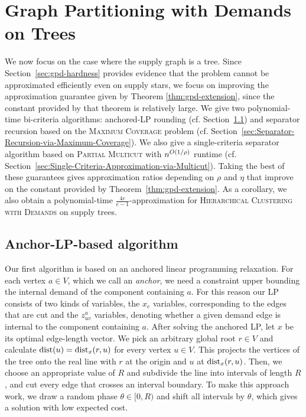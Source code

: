\section{Graph Partitioning with Demands on Trees}\label{sec:tree-configuration-lp}

We now focus on the case where the supply graph is a tree.
Since Section~\ref{sec:gpd-hardness} provides evidence that the problem cannot be approximated efficiently even on supply stars, we focus on improving the approximation guarantee given by Theorem \ref{thm:gpd-extension}, since the constant provided by that theorem is relatively large.
We give two polynomial-time bi-criteria algorithms: anchored-LP rounding (cf. Section~\ref{sec:Anchor-LP-based-algorithm}) and separator recursion based on the \textsc{Maximum Coverage} problem (cf. Section~\ref{sec:Separator-Recursion-via-Maximum-Coverage}). We also give a single-criteria separator algorithm based on \textsc{Partial Multicut} with $n^{O\mathopen{}\left( 1/\rho \right)}$ runtime (cf. Section~\ref{sec:Single-Criteria-Approximation-via-Multicut}).
Taking the best of these guarantees gives approximation ratios depending on $\rho$ and $\eta$ that improve on the constant provided by Theorem~\ref{thm:gpd-extension}.
As a corollary, we also obtain a polynomial-time $\frac{4e}{e-1}$-approximation for \textsc{Hierarchical Clustering with Demands} on supply trees. 

\subsection{Anchor-LP-based algorithm}
\label{sec:Anchor-LP-based-algorithm}

Our first algorithm is based on an anchored linear programming relaxation. For each vertex $a\in V$, which we call an \emph{anchor}, we need a constraint upper bounding the internal demand of the component containing $a$. For this reason our LP consists of two kinds of variables, the $x_e$ variables, corresponding to the edges that are cut and the $z^a_{uv}$ variables, denoting whether a given demand edge is internal to the component containing $a$.
After solving the anchored LP, let $x$ be its optimal edge-length vector. We pick an arbitrary global root $r\in V$ and calculate $\text{dist}(u)=\text{dist}_x(r,u)$ for every vertex $u\in V$. This projects the vertices of the tree onto the real line with $r$ at the origin and $u$ at $\text{dist}_x(r,u)$. Then, we choose an appropriate value of $R$ and subdivide the line into intervals of length $R$, and cut every edge that crosses an interval boundary. To make this approach work, we draw a random phase $\theta\in[0,R)$ and shift all intervals by $\theta$, which gives a solution with low expected cost. 

